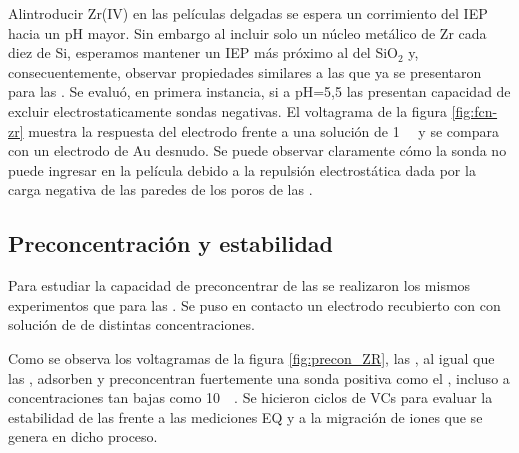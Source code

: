 	 	 Al\space introducir Zr(IV) en las películas delgadas se espera un corrimiento del IEP hacia un pH mayor\cite{Kosmulski2014}. Sin embargo al incluir solo un núcleo metálico de Zr cada diez de Si, esperamos mantener un IEP más próximo al del SiO$_2$ y, consecuentemente, observar propiedades similares a las que ya se presentaron para las \pdmF.
	 	 Se evaluó, en primera instancia, si a pH=5,5 las \pdmZ\space presentan capacidad de excluir electrostaticamente sondas negativas. El voltagrama de la figura \ref{fig:fcn-zr} muestra la respuesta del electrodo frente a una solución de \fe\space \SI{1}{\milli\Molar} y se compara con un electrodo de Au desnudo. Se puede observar claramente cómo la sonda no puede ingresar en la película debido a la repulsión electrostática dada por la carga negativa de las paredes de los poros de las \pdmZ. 
	
	 \subsection{Preconcentración y estabilidad}\label{sub:pcirc}

		 Para estudiar la capacidad de preconcentrar de las \pdmZ\space se realizaron los mismos experimentos que para las \pdmF. Se puso en contacto un electrodo recubierto con \pdmZ\space con solución de \ru\space de distintas concentraciones. 

	 	 Como se observa los voltagramas de la figura \ref{fig:precon_ZR}, las \pdmZ, al igual que las \pdmF, adsorben y preconcentran fuertemente una sonda positiva como el \ru,	incluso a concentraciones tan bajas como \SI{10}{\micro\Molar}. Se hicieron ciclos de VCs para evaluar la estabilidad de las \pdmZ\space frente a las mediciones EQ y a la migración de iones que se genera en dicho proceso. 

